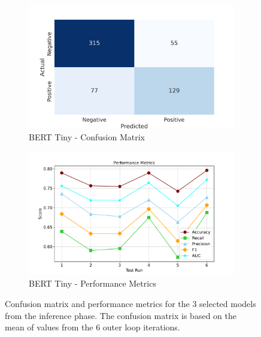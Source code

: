 \begin{figure}[!ht]
    \begin{subfigure}{0.45\linewidth}
        \includegraphics[width=\linewidth]{figures/confusion_berttiny.png}
        \caption{BERT Tiny - Confusion Matrix}
    \end{subfigure}
    \hfil
    \begin{subfigure}{0.45\linewidth}
        \includegraphics[width=\linewidth]{figures/metrics_line_berrttiny.pdf}
        \caption{BERT Tiny - Performance Metrics}
    \end{subfigure}
    \caption{Confusion matrix and performance metrics for the 3 selected models from the inference phase. The confusion matrix is based on the mean of values from the 6 outer loop iterations.}
    \label{fig: deep_dive_results}
\end{figure}

